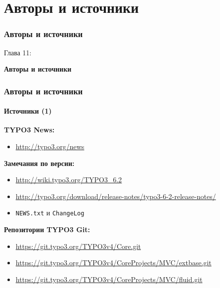 %

\section{Авторы и источники}
\begin{frame}[fragile]
	\frametitle{Авторы и источники}

	\begin{center}\huge{Глава 11:}\end{center}
	\begin{center}\huge{\color{typo3darkgrey}\textbf{Авторы и источники}}\end{center}

\end{frame}


\begin{frame}[fragile]
	\frametitle{Авторы и источники}
	\framesubtitle{Источники (1)}

	\textbf{TYPO3 News:}
		\begin{itemize}\smaller
			\item \url{http://typo3.org/news}
		\end{itemize}

	\textbf{Замечания по версии:}
		\begin{itemize}\smaller
			\item \url{http://wiki.typo3.org/TYPO3_6.2}
			\item \url{http://typo3.org/download/release-notes/typo3-6-2-release-notes/}
			\item \texttt{NEWS.txt} и \texttt{ChangeLog}
		\end{itemize}

	\textbf{Репозитории TYPO3 Git:}
		\begin{itemize}\smaller
			\item \url{https://git.typo3.org/TYPO3v4/Core.git}
			\item \url{https://git.typo3.org/TYPO3v4/CoreProjects/MVC/extbase.git}
			\item \url{https://git.typo3.org/TYPO3v4/CoreProjects/MVC/fluid.git}
		\end{itemize}

\end{frame}

